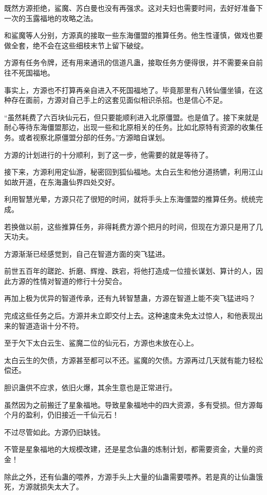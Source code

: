 \begin{this_body}
既然方源拒绝，鲨魔、苏白曼也没有再强求。这对夫妇也需要时间，去好好准备下一次的玉露福地的攻略之法。

和鲨魔等人分别，方源真的接取一些东海僵盟的推算任务。他生性谨慎，做戏也要做全套，绝不会在这些细枝末节上留下破绽。

方源有任务令牌，还有用来通讯的信道凡蛊，接取任务方便得很，并不需要亲自前往不死国福地。

事实上，方源也不打算再亲自进入不死国福地了。毕竟那里有八转仙僵坐镇，在这种存在面前，方源对自己手上的这套见面似相识杀招。也是信心不足。

“虽然耗费了六百块仙元石，但只要能顺利进入北原僵盟。也是值了。接下来就是耐心等待东海僵盟那边，出现一些和北原相关的任务。比如北原特有资源的收集任务。或者视察北原僵盟分部的任务。”方源暗自谋划。

方源的计划进行的十分顺利，到了这一步，他需要的就是等待了。

接下来，方源利用定仙游，秘密回到狐仙福地。太白云生和他分道扬镳，利用江山如故开道，在东海蛊仙界四处交好。

利用智慧光晕，方源只花了很短的时间，就将手头上东海僵盟的推算任务。统统完成。

若换做以前，这些推算任务，非得耗费方源个把月的时间，但现在方源只是用了几天功夫。

方源渐渐已经感觉到，自己在智道方面的突飞猛进。

前世五百年的蹉跎、折磨、辉煌、跌宕，将他打造成一位擅长谋划、算计的人，因此方源的性情对智道的修行十分契合。

再加上极为优异的智道传承，还有九转智慧蛊，方源在智道上能不突飞猛进吗？

完成这些任务之后。方源并未立即交付上去。这种速度未免太过惊人，和他表现出来的智道造诣十分不符。

至于欠下太白云生、鲨魔二位的仙元石，方源也未放在心上。

太白云生的欠债，方源甚至都可以不还。鲨魔的欠债。方源再过几天就有能力轻松偿还。

胆识蛊供不应求，依旧火爆，其余生意也是正常进行。

虽然因为之前搬迁了星象福地。导致星象福地中的四大资源，多有受损。但方源每个月的盈利，仍旧接近一千仙元石！

不过尽管如此。方源仍旧缺钱。

不管是星象福地的大规模改建，还是星念仙蛊的炼制计划，都需要资金，大量的资金！

除此之外，还有仙蛊的喂养，方源手头上大量的仙蛊需要喂养。若是真的让仙蛊饿死，方源就损失太大了。


\end{this_body}
